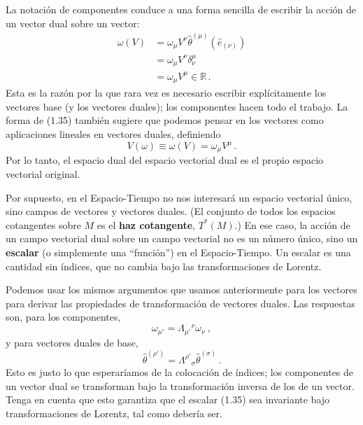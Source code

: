 \documentclass[11pt,b5paper,openany,twoside]{book}
\newcommand{\e}[1]{\hat{e}_{(#1)}}
\newcommand{\ztheta}[1]{{\hat{\theta}}^{(#1)}}
\begin{document}
La notación de componentes conduce a una forma sencilla de escribir la acción de un vector dual sobre un vector:
\begin{align}
\omega(V) &=  \omega_\mu V^\nu \ztheta{\mu}(\e\nu)\nonumber \\
&=  \omega_\mu V^\nu \delta^\mu_\nu\nonumber \\
&=  \omega_\mu V^\mu \in \mathbb{R} \,. \label{1.35}
\end{align}
Esta es la razón por la que rara vez es necesario escribir explícitamente los vectores base (y los vectores duales); los componentes hacen todo el trabajo.
La forma de (1.35) también sugiere que podemos pensar en los vectores como aplicaciones lineales en vectores duales, definiendo
\begin{equation}
V(\omega) \equiv \omega(V) = \omega_\mu V^\mu\,.\label{1.36}
\end{equation}
Por lo tanto, el espacio dual del espacio vectorial dual es el propio espacio vectorial original.

Por supuesto, en el Espacio-Tiempo no nos interesará un espacio vectorial único, sino campos de vectores y vectores duales.
(El conjunto de todos los espacios cotangentes sobre $M$ es el {\bf haz cotangente}, $T^*(M)$.)
En ese caso, la acción de un campo vectorial dual sobre un campo vectorial no es un número único, sino un {\bf escalar} (o simplemente una ``función'') en el Espacio-Tiempo.
Un escalar es una cantidad sin índices, que no cambia bajo las transformaciones de Lorentz.

Podemos usar los mismos argumentos que usamos anteriormente para los vectores para derivar las propiedades de transformación de vectores duales.
Las respuestas son, para los componentes,
\begin{equation}
\omega_{\mu'} = \Lambda_{\mu'}{}^\nu\omega_\nu\ ,\label{1.37}
\end{equation}
y para vectores duales de base,
\begin{equation}
 \ztheta{\rho'} = \Lambda^{\rho'}{}_\sigma \ztheta{\sigma}\,.\label{1.38}
\end{equation}
Esto es justo lo que esperaríamos de la colocación de índices; los componentes de un vector dual se transforman bajo la transformación inversa de los de un vector.
Tenga en cuenta que esto garantiza que el escalar (1.35) sea invariante bajo transformaciones de Lorentz, tal como debería ser.
\end{document}
